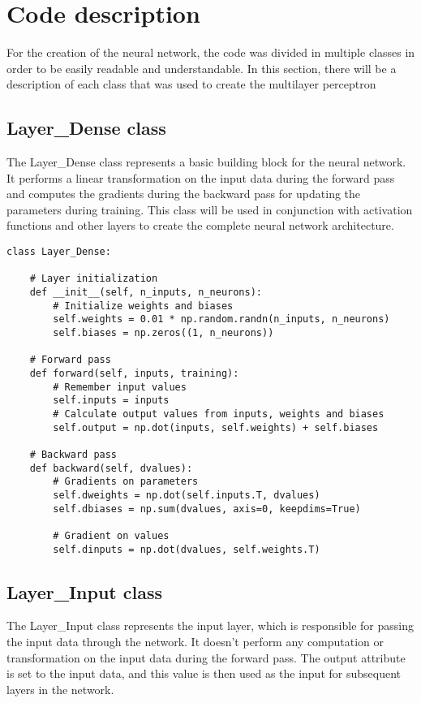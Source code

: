 \documentclass{article}
\begin{document}
\section{Code description}

For the creation of the neural network, the code was divided in multiple classes in order to be easily readable and understandable. In this section, there will be a description of each class that was used to create the multilayer perceptron 

\subsection{Layer\_Dense class}

The Layer\_Dense class represents a basic building block for the neural network. It performs a linear transformation on the input data during the forward pass and computes the gradients during the backward pass for updating the parameters during training. This class will be used in conjunction with activation functions and other layers to create the complete neural network architecture.
\begin{lstlisting}
class Layer_Dense:

    # Layer initialization
    def __init__(self, n_inputs, n_neurons):
        # Initialize weights and biases
        self.weights = 0.01 * np.random.randn(n_inputs, n_neurons)
        self.biases = np.zeros((1, n_neurons))

    # Forward pass
    def forward(self, inputs, training):
        # Remember input values
        self.inputs = inputs
        # Calculate output values from inputs, weights and biases
        self.output = np.dot(inputs, self.weights) + self.biases

    # Backward pass
    def backward(self, dvalues):
        # Gradients on parameters
        self.dweights = np.dot(self.inputs.T, dvalues)
        self.dbiases = np.sum(dvalues, axis=0, keepdims=True)

        # Gradient on values
        self.dinputs = np.dot(dvalues, self.weights.T)
\end{lstlisting}

\subsection{Layer\_Input class}
The Layer\_Input class represents the input layer, which is responsible for passing the input data through the network. It doesn't perform any computation or transformation on the input data during the forward pass. The output attribute is set to the input data, and this value is then used as the input for subsequent layers in the network.
\end{document}
